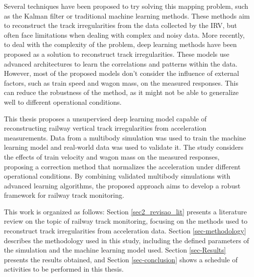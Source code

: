 Several techniques have been proposed to try solving this mapping problem, such as the Kalman filter or traditional machine learning methods. These methods aim to reconstruct the track irregularities from the data collected by the IRV, but often face limitations when dealing with complex and noisy data. More recently, to deal with the complexity of the problem, deep learning methods have been proposed as a solution to reconstruct track irregularities. These models use advanced architectures to learn the correlations and patterns within the data. However, most of the proposed models don't consider the influence of external factors, such as train speed and wagon mass, on the measured responses. This can reduce the robustness of the method, as it might not be able to generalize well to different operational conditions.

This thesis proposes a unsupervised deep learning model capable of reconstructing railway vertical track irregularities from acceleration measurements. Data from a multibody simulation was used to train the machine learning model and real-world data was used to validate it. The study considers the effects of train velocity and wagon mass on the measured responses, proposing a correction method that normalizes the acceleration under different operational conditions. By combining validated multibody simulations with advanced learning algorithms, the proposed approach aims to develop a robust framework for railway track monitoring.

This work is organized as follows: Section \ref{sec2_revisao_lit} presents a literature review on the topic of railway track monitoring, focusing on the methods used to reconstruct track irregularities from acceleration data. Section \ref{sec-methodology} describes the methodology used in this study, including the defined parameters of the simulation and the machine learning model used. Section \ref{sec-Results} presents the results obtained, and Section \ref{sec-conclusion} shows a schedule of activities to be performed in this thesis.
